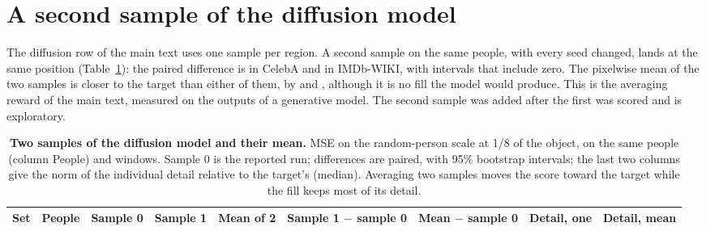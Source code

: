 \section{A second sample of the diffusion model}
\label{sec:s-samples}
The diffusion row of the main text uses one sample per region.
A second sample on the same people, with every seed changed, lands at the same position (Table~\ref{tab:s-samples}): the paired difference is \mfSamplesCelebaDiffOne{} in CelebA and \mfSamplesImdbDiffOne{} in IMDb-WIKI, with intervals that include zero.
The pixelwise mean of the two samples is closer to the target than either of them, by \mfSamplesCelebaDiffMean{} and \mfSamplesImdbDiffMean{}, although it is no fill the model would produce.
This is the averaging reward of the main text, measured on the outputs of a generative model.
The second sample was added after the first was scored and is exploratory.

\begin{table}[htbp]
\centering
\caption{\textbf{Two samples of the diffusion model and their mean.}
\acs{MSE} on the random-person scale at 1/8 of the object, on the same people (column People) and windows.
Sample 0 is the reported run; differences are paired, with 95\% bootstrap intervals; the last two columns give the norm of the individual detail relative to the target's (median).
Averaging two samples moves the score toward the target while the fill keeps most of its detail.}
\label{tab:s-samples}
\small
\setlength{\tabcolsep}{4pt}
\begin{tabular}{@{}lrrrrllrr@{}}
\toprule
Set & People & Sample 0 & Sample 1 & Mean of 2 & Sample 1 $-$ sample 0 & Mean $-$ sample 0 & Detail, one & Detail, mean \\
\midrule
\end{tabular}
\end{table}
